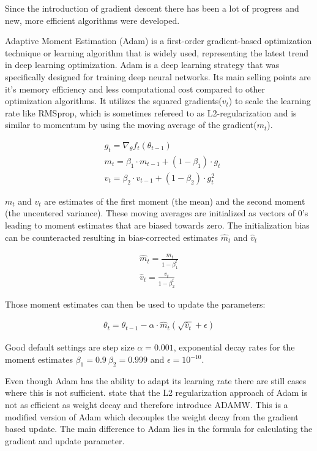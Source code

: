\documentclass[
a4paper, 
12pt,
grayscalebody, %
abstract=on,
twoside, BCOR10mm, 12pt, DIV13,headinclude, footexclude, final, abstracton, openright
]{ibireprt}
\numberwithin{equation}{chapter}
\numberwithin{table}{chapter}
\numberwithin{figure}{chapter}
\numberwithin{algorithm}{chapter}
\numberwithin{example}{chapter}
\numberwithin{example}{chapter}
\begin{document}
Since the introduction of gradient descent there has been a lot of progress and new, more efficient algorithms were developed. 

Adaptive Moment Estimation (Adam) \cite{Kingma2014} is a first-order gradient-based optimization technique or learning algorithm that is widely used, representing the latest trend in deep learning optimization. Adam is a deep learning strategy that was specifically designed for training deep neural networks. Its main selling points are it's memory efficiency and less computational cost compared to other optimization algorithms. 
It  utilizes the squared gradients($v_t$) to scale the learning rate like RMSprop, which is sometimes refereed to as L2-regularization and is similar to momentum by using the moving average of the gradient($m_t$).


\begin{align}
	& g_t = \nabla_\theta f_t(\theta_{t-1})\\
	& m_t =\beta_1\cdot m_{t-1} + (1- \beta_1)\cdot g_t \\
	& v_t =\beta_2\cdot v_{t-1} + (1- \beta_2)\cdot g_t^2
\end{align}

$m_t$ and $v_t$ are estimates of the first moment (the mean) and the second moment (the uncentered
variance). These moving averages are initialized as vectors of 0's leading to moment estimates that are  biased towards zero. The initialization bias can be counteracted resulting in bias-corrected estimates $\hat{m}_t$ and $\hat{v}_t$

\begin{align}
	\hat{m}_t =\frac{m_t}{1- \beta_1^t} \\
	\hat{v}_t = \frac{v_t}{1- \beta_2^t}
\end{align}

Those moment estimates can then be used to update the parameters: 

\begin{align}
	\theta_t = \theta_{t-1}-\alpha\cdot\hat{m}_t(\sqrt{\hat{v}_t}+\epsilon)
\end{align}

Good default settings are step size $\alpha = 0.001$, exponential decay rates for the moment estimates $\beta_1 = 0.9\ \beta_2 = 0.999 $ and $\epsilon =  10^{-10}$.



Even though Adam has the ability to adapt its learning rate there are still cases where this is not sufficient. \cite{Loshchilov2017} state that the L2 regularization approach of Adam is not as efficient as weight decay and therefore introduce ADAMW. This is a modified version of Adam which decouples the weight decay from the gradient based update. The main difference to Adam lies in the formula for calculating the gradient and update parameter. 
\end{document}
